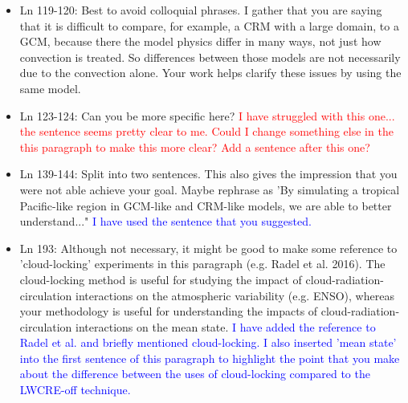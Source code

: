 \documentclass[draft]{agujournal2019}
\begin{document}
\begin{itemize}
  \item Ln 119-120: Best to avoid colloquial phrases. I gather that you are saying that it is difficult to compare, for example, a CRM with a large domain, to a GCM, because there the model physics differ in many ways, not just how convection is treated. So differences between those models are not necessarily due to the convection alone. Your work helps clarify these issues by using the same model.
  
  \item Ln 123-124: Can you be more specific here?
  \textcolor{red}{I have struggled with this one... the sentence seems pretty clear to me.  Could I change something else in the this paragraph to 
  make this more clear?  Add a sentence after this one?}
  
  \item Ln 139-144: Split into two sentences. This also gives the impression that you were not able achieve your goal. Maybe rephrase as 'By simulating a tropical Pacific-like region in GCM-like and CRM-like models, we are able to better understand..."
  \textcolor{blue}{I have used the sentence that you suggested.}
  
  \item Ln 193: Although not necessary, it might be good to make some reference to 'cloud-locking' experiments in this paragraph (e.g. Radel et al. 2016).  The cloud-locking method is useful for studying the impact of cloud-radiation-circulation interactions on the atmospheric variability (e.g. ENSO), whereas your methodology is useful for understanding the impacts of cloud-radiation-circulation interactions on the mean state. 
  \textcolor{blue}{I have added the reference to Radel et al. and briefly mentioned cloud-locking.  I also inserted 'mean state' into the first sentence of this paragraph to highlight the point that you make about the difference between the uses of cloud-locking compared to the LWCRE-off technique.}
  

\end{itemize}
\end{document}
